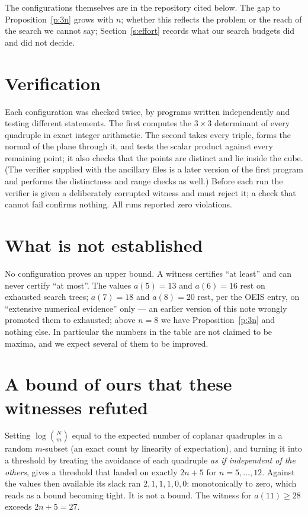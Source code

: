 \documentclass[11pt,a4paper]{article}
\begin{document}
The configurations themselves are in the repository cited below.  The gap to
Proposition~\ref{p:3n} grows with $n$; whether this reflects the problem or the reach of the
search we cannot say; Section~\ref{s:effort} records what our search budgets did and did not decide.

\section{Verification}
Each configuration was checked twice, by programs written independently and testing different
statements.  The first computes the $3\times3$ determinant of every quadruple in exact integer
arithmetic.  The second takes every triple, forms the normal of the plane through it, and tests
the scalar product against every remaining point; it also checks that the points are distinct
and lie inside the cube.  (The verifier supplied with the ancillary files is a later version of the
first program and performs the distinctness and range checks as well.)  Before each run the verifier is
given a deliberately corrupted witness and must reject it; a check that cannot fail confirms
nothing.  All runs reported zero violations.

\section{What is not established}\label{s:notest}
No configuration proves an upper bound.  A witness certifies ``at least'' and can never certify
``at most''.  The values $a(5)=13$ and $a(6)=16$ rest on exhausted search trees; $a(7)=18$ and
$a(8)=20$ rest, per the OEIS entry, on ``extensive numerical evidence'' only --- an earlier
version of this note wrongly promoted them to exhausted; above $n=8$ we have
Proposition~\ref{p:3n} and nothing else.  In particular the numbers
in the table are not claimed to be maxima, and we expect several of them to be improved.

\section{A bound of ours that these witnesses refuted}
Setting $\log\binom{N}{m}$ equal to the expected number of coplanar quadruples in a random
$m$-subset (an exact count by linearity of expectation), and turning it into a threshold by treating
the avoidance of each quadruple \emph{as if independent of the others}, gives a threshold that
landed on exactly $2n+5$ for $n=5,\dots,12$.  Against the values then available its slack ran
$2,1,1,1,0,0$: monotonically to zero, which reads as a bound becoming tight.  It is not a bound.
The witness for $a(11)\ge28$ exceeds $2n+5=27$.
\end{document}
